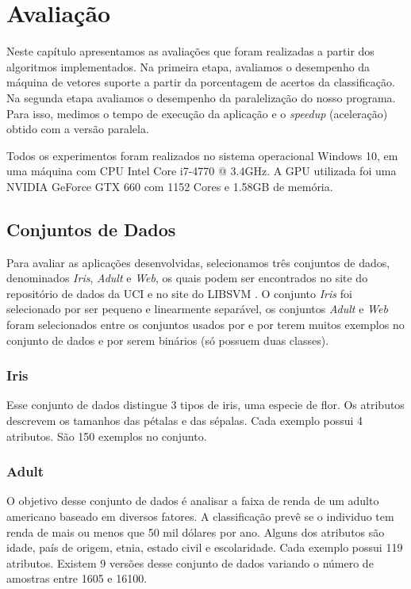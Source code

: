 \chapter{Avaliação} \label{chp:LABEL_CHP_5}

Neste capítulo apresentamos as avaliações que foram realizadas a partir dos algoritmos implementados. Na primeira etapa, avaliamos o desempenho da máquina de vetores suporte a partir da porcentagem de acertos da classificação. Na segunda etapa avaliamos o desempenho da paralelização do nosso programa. 
Para isso, medimos o tempo de execução da aplicação e o {\em speedup} (aceleração) obtido com a versão paralela.

Todos os experimentos foram realizados no sistema operacional Windows 10, em uma máquina com CPU Intel Core i7-4770 @ 3.4GHz. A GPU utilizada foi uma NVIDIA GeForce GTX 660 com 1152 Cores e 1.58GB de memória.

\section{Conjuntos de Dados}\label{sec:LABEL_CHP_5_SEC_A}
Para avaliar as aplicações desenvolvidas, selecionamos três conjuntos de dados, denominados  {\em Iris}, {\em Adult} e {\em Web}, os quais podem ser encontrados no site do repositório de dados da UCI \cite{UCI} e no site do LIBSVM \cite{art:LIBSVM}. O conjunto {\em Iris} foi selecionado por ser pequeno e linearmente separável, os conjuntos \emph{Adult} e \emph{Web} foram selecionados entre os conjuntos usados por \cite{art:REF_ART_1} e \cite{art:REF_ART_2} por terem muitos exemplos no conjunto de dados e por serem binários (só possuem duas classes).

\subsection{Iris} \label{sec:Iris}
Esse conjunto de dados distingue 3 tipos de iris, uma especie de flor. Os atributos descrevem os tamanhos das pétalas e das sépalas. Cada exemplo possui 4 atributos. São 150 exemplos no conjunto.
\subsection{Adult} \label{sec:Adult}
O objetivo desse conjunto de dados é analisar a faixa de renda de um adulto americano baseado em diversos fatores. A classificação prevê se o individuo tem renda de mais ou menos que 50 mil dólares por ano. Alguns dos atributos são idade, país de origem, etnia, estado civil e escolaridade. Cada exemplo possui 119 atributos. Existem 9 versões desse conjunto de dados variando o número de amostras entre 1605 e 16100.
